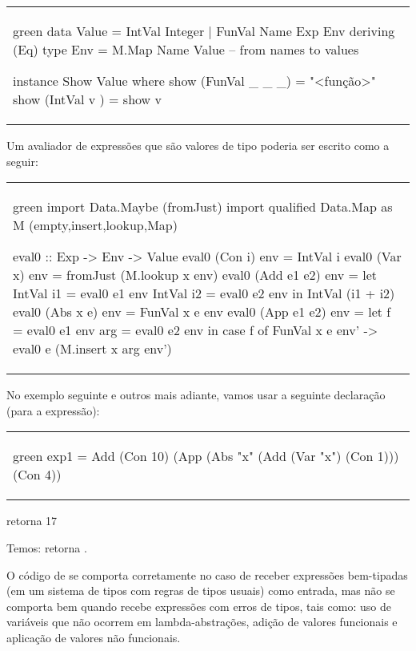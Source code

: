 \begin{center}
\begin{tabular}{l}
\begin{hask}{}{green}
data Value  =  IntVal Integer 
            |  FunVal Name Exp Env 
            deriving (Eq)
type Env    =  M.Map Name Value    -- from names to values

instance Show Value where
  show (FunVal _ _ _) =  "<função>"
  show (IntVal v    ) =  show v
\end{hask}
\end{tabular}
\end{center}

Um avaliador de expressões que são valores de tipo  poderia
ser escrito como a seguir:

\begin{center}
\begin{tabular}{l}
\begin{hask}{}{green}
import                 Data.Maybe    (fromJust)
import qualified       Data.Map as M (empty,insert,lookup,Map)

eval0 :: Exp -> Env -> Value
eval0 (Con i)     env = IntVal i
eval0 (Var x)     env = fromJust (M.lookup x env)
eval0 (Add e1 e2) env = let IntVal i1  = eval0 e1 env
                            IntVal i2  = eval0 e2 env 
                         in IntVal (i1 + i2)
eval0 (Abs x e)   env = FunVal x e env 
eval0 (App e1 e2) env = let f   = eval0 e1 env
                            arg = eval0 e2 env 
                         in case f of
                              FunVal x e env' -> eval0 e (M.insert x arg env')
\end{hask}
\end{tabular}
\end{center}

No exemplo seguinte e outros mais adiante, vamos usar a seguinte declaração
(para a expressão): 

\begin{center}
\begin{tabular}{l}
\begin{hask}{}{green}
exp1 = Add (Con 10) (App (Abs "x" (Add (Var "x") (Con 1))) (Con 4))
\end{hask}
\end{tabular}
\end{center}
 retorna 17

Temos:  retorna .

O código de  se comporta corretamente no caso de receber
expressões bem-tipadas (em um sistema de tipos com regras de tipos
usuais) como entrada, mas não se comporta bem quando recebe expressões
com erros de tipos, tais como: uso de variáveis que não ocorrem em
lambda-abstrações, adição de valores funcionais e aplicação de valores
não funcionais. 

